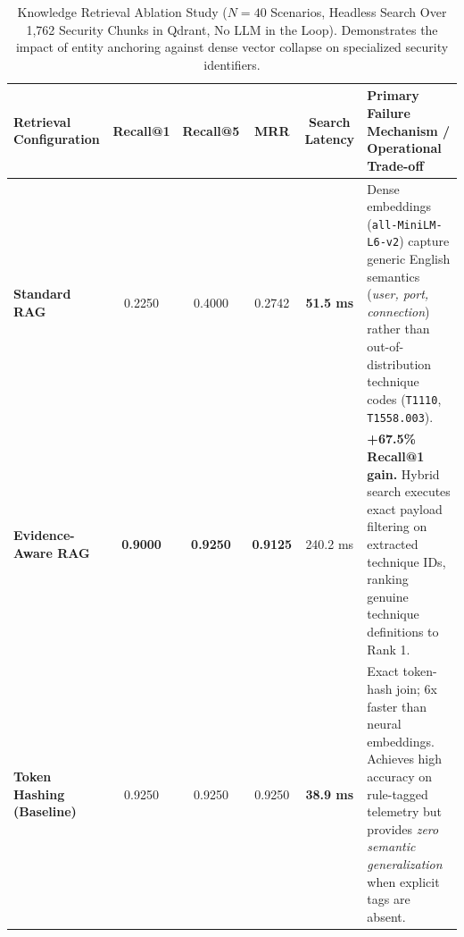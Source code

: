 \begin{table}[t]
\centering
\small
\caption{Knowledge Retrieval Ablation Study ($N = 40$ Scenarios, Headless Search Over 1,762 Security Chunks in Qdrant, No LLM in the Loop). Demonstrates the impact of entity anchoring against dense vector collapse on specialized security identifiers.}
\label{tab:retrieval_ablation}
\begin{tabular}{lccccp{6.5cm}}
\toprule
\textbf{Retrieval Configuration} & \textbf{Recall@1} & \textbf{Recall@5} & \textbf{MRR} & \textbf{Search Latency} & \textbf{Primary Failure Mechanism / Operational Trade-off} \\
\midrule
\textbf{Standard RAG} & 0.2250 & 0.4000 & 0.2742 & \textbf{51.5 ms} & Dense embeddings (\texttt{all-MiniLM-L6-v2}) capture generic English semantics (\textit{user, port, connection}) rather than out-of-distribution technique codes (\texttt{T1110}, \texttt{T1558.003}). \\
\addlinespace
\textbf{Evidence-Aware RAG} & \textbf{0.9000} & \textbf{0.9250} & \textbf{0.9125} & 240.2 ms & \textbf{+67.5\% Recall@1 gain.} Hybrid search executes exact payload filtering on extracted technique IDs, ranking genuine technique definitions to Rank 1. \\
\addlinespace
\textbf{Token Hashing (Baseline)} & 0.9250 & 0.9250 & 0.9250 & \textbf{38.9 ms} & Exact token-hash join; 6x faster than neural embeddings. Achieves high accuracy on rule-tagged telemetry but provides \textit{zero semantic generalization} when explicit tags are absent. \\
\bottomrule
\end{tabular}
\end{table}

